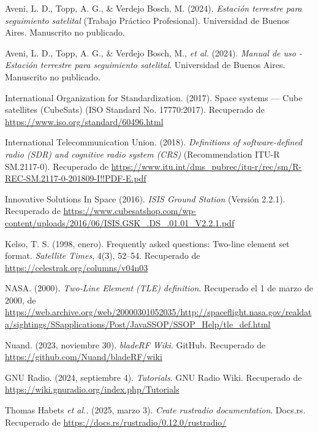 
Aveni, L. D., Topp, A. G., \& Verdejo Bosch, M. (2024). \textit{Estación terrestre para seguimiento satelital} (Trabajo Práctico Profesional). Universidad de Buenos Aires. Manuscrito no publicado.

Aveni, L. D., Topp, A. G., \& Verdejo Bosch, M., \textit{et al.} (2024). \textit{Manual de uso - Estación terrestre para seguimiento satelital}. Universidad de Buenos Aires. Manuscrito no publicado.

International Organization for Standardization. (2017). Space systems — Cube satellites (CubeSats) (ISO Standard No. 17770:2017). Recuperado de \url{https://www.iso.org/standard/60496.html}

International Telecommunication Union. (2018). \textit{Definitions of software-defined radio (SDR) and cognitive radio system (CRS)} (Recommendation ITU-R SM.2117-0). Recuperado de \url{https://www.itu.int/dms\_pubrec/itu-r/rec/sm/R-REC-SM.2117-0-201809-I!!PDF-E.pdf}

Innovative Solutions In Space (2016). \textit{ISIS Ground Station} (Versión 2.2.1). Recuperado de \url{https://www.cubesatshop.com/wp-content/uploads/2016/06/ISIS.GSK\_.DS\_.01.01\_V2.2.1.pdf}

Kelso, T. S. (1998, enero). Frequently asked questions: Two-line element set format. \textit{Satellite Times}, 4(3), 52–54. Recuperado de \url{https://celestrak.org/columns/v04n03}

NASA. (2000). \textit{Two-Line Element (TLE) definition}. Recuperado el 1 de marzo de 2000, de \url{https://web.archive.org/web/20000301052035/http://spaceflight.nasa.gov/realdata/sightings/SSapplications/Post/JavaSSOP/SSOP_Help/tle_def.html}

Nuand. (2023, noviembre 30). \textit{bladeRF Wiki}. GitHub. Recuperado de \url{https://github.com/Nuand/bladeRF/wiki}

GNU Radio. (2024, septiembre 4). \textit{Tutorials}. GNU Radio Wiki. Recuperado de \url{https://wiki.gnuradio.org/index.php/Tutorials}

Thomas Habets \textit{et al.}. (2025, marzo 3). \textit{Crate rustradio documentation}. Docs.rs. Recuperado de \url{https://docs.rs/rustradio/0.12.0/rustradio/}
